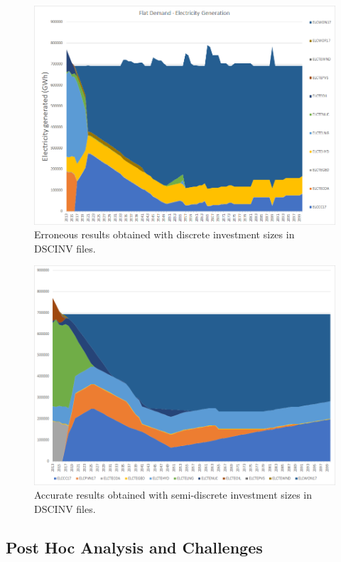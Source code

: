 \documentclass[14pt,a4paper]{article} %
\begin{document}
\begin{figure}[H]
\centering
\includegraphics[scale=0.6]{flat-bug}
\caption{Erroneous results obtained with discrete investment sizes in \gls{DSCINV} files.}
\label{flatbug}
\end{figure}

\begin{figure}[H]
\centering
\includegraphics[scale=0.6]{flat-good}
\caption{Accurate results obtained with semi-discrete investment sizes in \gls{DSCINV} files.}
\label{flatgood}
\end{figure}

\subsection{Post Hoc Analysis and Challenges} 
\end{document}
